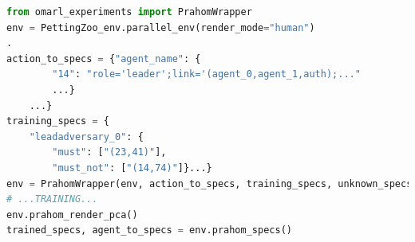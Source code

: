 \documentclass[contribution]{jfsma}
\begin{document}
\begin{lstlisting}[language=Python, caption={Utilisation basique de \emph{PRAHOM PettingZoo Wrapper}}, label={lst:wrapper_basic_use}]
from omarl_experiments import PrahomWrapper
env = PettingZoo_env.parallel_env(render_mode="human")
.
action_to_specs = {"agent_name": {
        "14": "role='leader';link='(agent_0,agent_1,auth);..."
        ...}    
    ...}
training_specs = {
    "leadadversary_0": {
        "must": ["(23,41)"],
        "must_not": ["(14,74)"]}...}
env = PrahomWrapper(env, action_to_specs, training_specs, unknown_specs_inference=True, pca_output=True)
# ...TRAINING...
env.prahom_render_pca()
trained_specs, agent_to_specs = env.prahom_specs()
\end{lstlisting}



\end{document}
